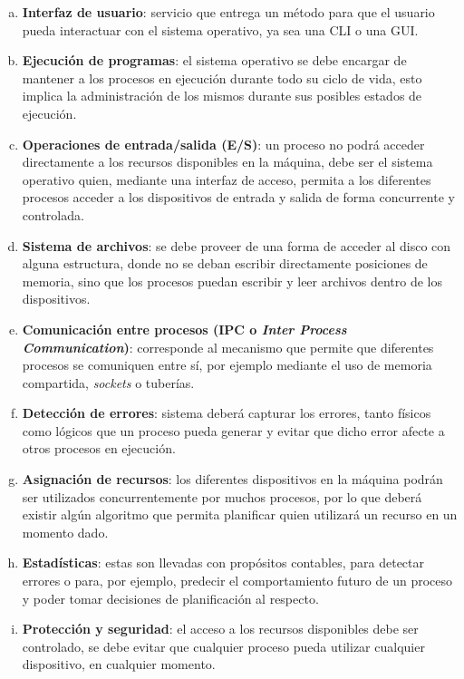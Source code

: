 \begin{enumerate}[a.]

	\item \textbf{Interfaz de usuario}: servicio que entrega un método para
	que el usuario pueda interactuar con el sistema operativo, ya sea una
	CLI o una GUI.

	\item \textbf{Ejecución de programas}: el sistema operativo se debe
	encargar de mantener a los procesos en ejecución durante todo su ciclo
	de vida, esto implica la administración de los mismos durante sus
	posibles estados de ejecución.

	\item \textbf{Operaciones de entrada/salida (E/S)}: un proceso no podrá
	acceder directamente a los recursos disponibles en la máquina, debe ser
	el sistema operativo quien, mediante una interfaz de acceso, permita a
	los diferentes procesos acceder a los dispositivos de entrada y salida
	de forma concurrente y controlada.

	\item \textbf{Sistema de archivos}: se debe proveer de una forma de
	acceder al disco con alguna estructura, donde no se deban escribir
	directamente posiciones de memoria, sino que los procesos puedan
	escribir y leer archivos dentro de los dispositivos.

	\item \textbf{Comunicación entre procesos (IPC o \textit{Inter Process
	Communication})}: corresponde al mecanismo que permite que diferentes
	procesos se comuniquen entre sí, por ejemplo mediante el uso de memoria
	compartida, \textit{sockets} o tuberías.

	\item \textbf{Detección de errores}: sistema deberá capturar los
	errores, tanto físicos como lógicos que un proceso pueda generar y
	evitar que dicho error afecte a otros procesos en ejecución.

	\item \textbf{Asignación de recursos}: los diferentes dispositivos en la
	máquina podrán ser utilizados concurrentemente por muchos procesos, por
	lo que deberá existir algún algoritmo que permita planificar quien
	utilizará un recurso en un momento dado.

	\item \textbf{Estadísticas}: estas son llevadas con propósitos
	contables, para detectar errores o para, por ejemplo, predecir el
	comportamiento futuro de un proceso y poder tomar decisiones de
	planificación al respecto.

	\item \textbf{Protección y seguridad}: el acceso a los recursos
	disponibles debe ser controlado, se debe evitar que cualquier proceso
	pueda utilizar cualquier dispositivo, en cualquier momento.

\end{enumerate}

